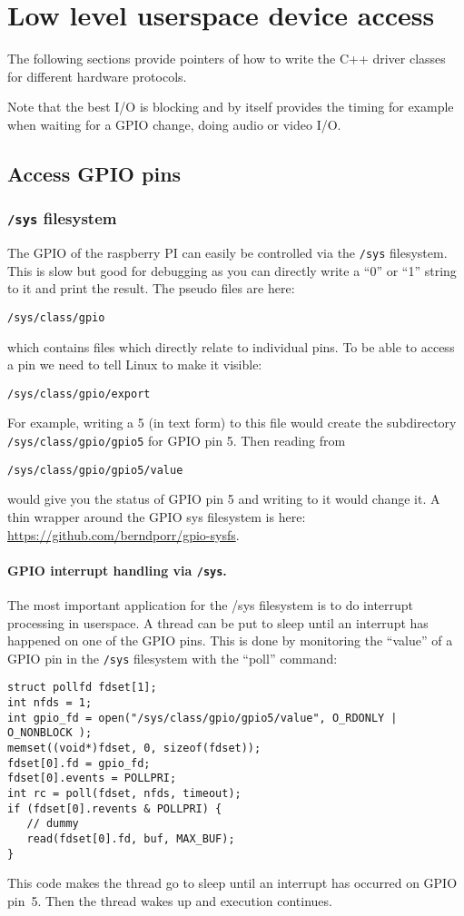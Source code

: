\documentclass[12pt]{report}
\begin{document}
\section{Low level userspace device access}
The following sections provide pointers of how to write
the C++ driver classes for different hardware protocols.

Note that the best I/O is blocking and by itself provides the timing for example
when waiting for a GPIO change, doing audio or video I/O.



\subsection{Access GPIO pins}
\subsubsection{\texttt{/sys} filesystem}
The GPIO of the raspberry PI can easily be controlled via
the \texttt{/sys} filesystem. This is slow but good for
debugging as you can directly write a
``0'' or ``1'' string to it and print the result. The
pseudo files are here:
\begin{verbatim}
/sys/class/gpio
\end{verbatim}
which contains files which directly relate to individual pins.
To be able to access a pin we need to tell Linux to make
it visible:
\begin{verbatim}
/sys/class/gpio/export
\end{verbatim}
For example, writing a 5 (in text form) to this file would
create the subdirectory \texttt{/sys/class/gpio/gpio5} for GPIO pin 5.
Then reading from
\begin{verbatim}
/sys/class/gpio/gpio5/value
\end{verbatim}
would give you the status of GPIO pin 5 and writing
to it would change it.
A thin wrapper around the GPIO sys filesystem is here: \url{https://github.com/berndporr/gpio-sysfs}.

\paragraph{GPIO interrupt handling via \texttt{/sys}\label{gpioIRQ}.}
The most important application for the /sys filesystem is to
do interrupt processing in userspace.
A thread can be put to sleep until an interrupt has happened on one of
the GPIO pins. This is done by monitoring the ``value''
of a GPIO pin in the \texttt{/sys} filesystem with the ``poll'' command:
\begin{verbatim}
struct pollfd fdset[1];
int nfds = 1;
int gpio_fd = open("/sys/class/gpio/gpio5/value", O_RDONLY | O_NONBLOCK );
memset((void*)fdset, 0, sizeof(fdset));
fdset[0].fd = gpio_fd;
fdset[0].events = POLLPRI;
int rc = poll(fdset, nfds, timeout);
if (fdset[0].revents & POLLPRI) {
   // dummy
   read(fdset[0].fd, buf, MAX_BUF);
}
\end{verbatim}
This code makes the thread go to sleep until an interrupt has occurred on
GPIO pin~5. Then the thread wakes up and execution continues.
\end{document}
